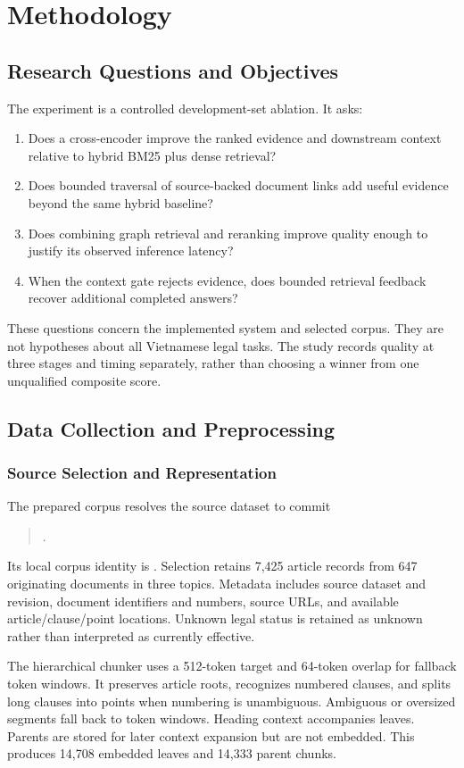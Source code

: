 \chapter{Methodology}\label{ch:methodology}
\section{Research Questions and Objectives}
The experiment is a controlled development-set ablation. It asks:
\begin{enumerate}
\item Does a cross-encoder improve the ranked evidence and downstream context relative to hybrid BM25 plus dense retrieval?
\item Does bounded traversal of source-backed document links add useful evidence beyond the same hybrid baseline?
\item Does combining graph retrieval and reranking improve quality enough to justify its observed inference latency?
\item When the context gate rejects evidence, does bounded retrieval feedback recover additional completed answers?
\end{enumerate}
These questions concern the implemented system and selected corpus. They are not hypotheses about all Vietnamese legal tasks. The study records quality at three stages and timing separately, rather than choosing a winner from one unqualified composite score.

\section{Data Collection and Preprocessing}
\subsection{Source Selection and Representation}
The prepared corpus resolves the source dataset to commit
\begin{quote}\small{}.\end{quote}
Its local corpus identity is . Selection retains 7,425 article records from 647 originating documents in three topics. Metadata includes source dataset and revision, document identifiers and numbers, source URLs, and available article/clause/point locations. Unknown legal status is retained as unknown rather than interpreted as currently effective.

The hierarchical chunker uses a 512-token target and 64-token overlap for fallback token windows. It preserves article roots, recognizes numbered clauses, and splits long clauses into points when numbering is unambiguous. Ambiguous or oversized segments fall back to token windows. Heading context accompanies leaves. Parents are stored for later context expansion but are not embedded. This produces 14,708 embedded leaves and 14,333 parent chunks.

